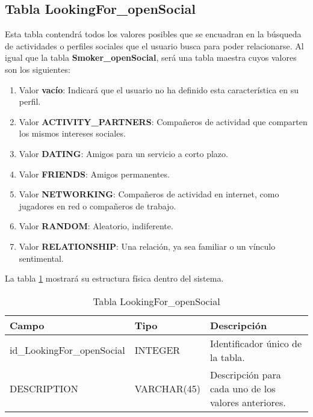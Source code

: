 \subsection{Tabla LookingFor\_openSocial}
Esta tabla contendrá todos los valores posibles que se encuadran en la búsqueda de actividades o perfiles sociales que el usuario busca para poder relacionarse. Al igual que la tabla \textbf{Smoker\_openSocial}, será una tabla maestra cuyos valores son los siguientes:
\begin{enumerate}
\item Valor \textbf{vacío}: Indicará que el usuario no ha definido esta característica en su perfil.
\item Valor \textbf{ACTIVITY\_PARTNERS}: Compañeros de actividad que comparten los mismos intereses sociales.
\item Valor \textbf{DATING}: Amigos para un servicio a corto plazo.
\item Valor \textbf{FRIENDS}: Amigos permanentes.
\item Valor \textbf{NETWORKING}: Compañeros de actividad en internet, como jugadores en red o compañeros de trabajo.
\item Valor \textbf{RANDOM}: Aleatorio, indiferente.
\item Valor \textbf{RELATIONSHIP}: Una relación, ya sea familiar o un vínculo sentimental.
\end{enumerate}
\bigskip
\par
La tabla \ref{tabLookingForOpenSocial} mostrará su estructura física dentro del sistema.
\bigskip
\par
\begin{table}[h]
\begin{center}
\begin{tabular}{| l | l | p{60mm} |}\hline
\textbf{Campo}&\textbf{Tipo}&\textbf{Descripción} \\ \hline
id\_LookingFor\_openSocial & INTEGER & Identificador único de la tabla. \\ \hline
DESCRIPTION & VARCHAR(45) & Descripción para cada uno de los valores anteriores. \\ \hline
\end{tabular}
\end{center}
\caption{Tabla LookingFor\_openSocial} \label{tabLookingForOpenSocial}
\end{table}

